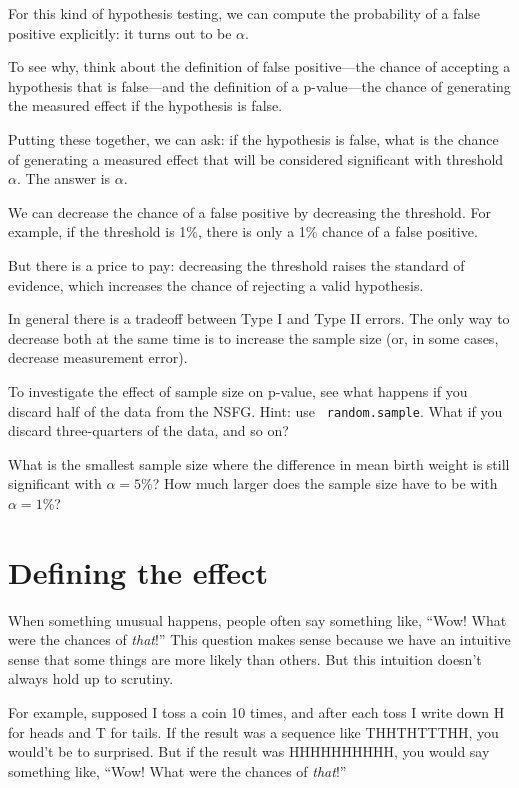 \documentclass[12pt]{book}
\begin{document}
For this kind of hypothesis testing, we can compute the probability of
a false positive explicitly: it turns out to be $\alpha$.

To see why, think about the definition of false positive---the chance
of accepting a hypothesis that is false---and the definition of a
p-value---the chance of generating the measured effect if the
hypothesis is false.

Putting these together, we can ask: if the hypothesis is false,
what is the chance of generating a measured effect that will be
considered significant with threshold $\alpha$.  The answer is
$\alpha$.

We can decrease the chance of a false positive by decreasing the
threshold.  For example, if the threshold is 1\%, there is only a 1\%
chance of a false positive.

But there is a price to pay: decreasing the threshold raises the
standard of evidence, which increases the chance of rejecting
a valid hypothesis.

In general there is a tradeoff between Type I and Type II errors.
The only way to decrease both at the same time is to increase the
sample size (or, in some cases, decrease measurement error).

\begin{ex}

To investigate the effect of sample size on p-value, see what happens
if you discard half of the data from the NSFG.  Hint: use {\tt
  random.sample}.  What if you discard three-quarters of the data, and
so on?

What is the smallest sample size where the difference in mean birth
weight is still significant with $\alpha=5$\%?  How much
larger does the sample size have to be with $\alpha=1$\%?

\end{ex}


\section{Defining the effect}

When something unusual happens, people often say something like,
``Wow!  What were the chances of {\em that}!''  This question makes
sense because we have an intuitive sense that some things are more
likely than others.  But this intuition doesn't always hold up to
scrutiny.

For example, supposed I toss a coin 10 times, and after each toss I
write down H for heads and T for tails.  If the result was a sequence
like THHTHTTTHH, you would't be to surprised.  But if the result was
HHHHHHHHHH, you would say something like, ``Wow!  What were the
chances of {\em that}!''
\end{document}
